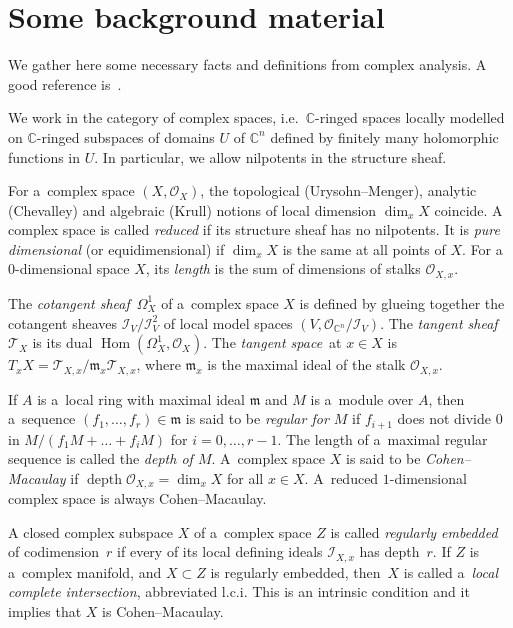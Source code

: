 \section{Some background material
\label{back}
}

We gather here some necessary facts and def\/initions from complex analysis.
A good reference is~\cite{GR}.

We work in the category of complex spaces, i.e.\
${\mathbb C}$-ringed spaces locally modelled on ${\mathbb C}$-ringed subspaces of domains $U$ of ${\mathbb C}^n$ def\/ined
by f\/initely many holomorphic functions in $U$.
In particular, we allow nilpotents in the structure sheaf.

For a~complex space $(X,{\mathcal{O}}_X)$, the topological (Urysohn--Menger), analytic (Chevalley) and algebraic (Krull)
notions of local dimension $\dim_xX$ coincide.
A complex space is called {\em reduced} if its structure sheaf has no nilpotents.
It is {\em pure dimensional} (or equidimensional) if $\dim_x X$ is the same at all points of $X$.
For a~$0$-dimensional space $X$, its {\em length} is the sum of dimensions of stalks ${\mathcal{O}}_{X,x}$.

The {\em cotangent sheaf}\, $\Omega^1_X$ of a~complex space $X$ is def\/ined by glueing together the cotangent sheaves
${\mathcal{I}}_V/{\mathcal{I}}_V^2$ of local model spaces $(V, {\mathcal{O}}_{{\mathbb C}^n}/{\mathcal{I}}_V)$.
The {\em tangent sheaf}\, ${\mathcal{T}}_X$ is its dual $\operatorname{Hom}(\Omega^1_X,{\mathcal{O}}_X)$.
The {\em tangent space}\, at $x\in X$ is $T_xX={\mathcal{T}}_{X,x}/\mathfrak{m}_x {\mathcal{T}}_{X,x}$, where
$\mathfrak{m}_x$ is the maximal ideal of the stalk ${\mathcal{O}}_{X,x}$.

If $A$ is a~local ring with maximal ideal $\mathfrak{m}$ and $M$ is a~module over $A$, then a~sequence
$(f_1,\dots,f_r)\in \mathfrak{m}$ is said to be {\em regular for $M$} if $f_{i+1}$ does not divide $0$ in
$M/(f_1M+\dots+f_iM)$ for $i=0,\dots, r-1$.
The length of a~maximal regular sequence is called the {\em depth of $M$}.
A~complex space $X$ is said to be {\em Cohen--Macaulay} if $\operatorname{depth}{\mathcal{O}}_{X,x}=\dim_xX$ for all
$x\in X$.
A~reduced $1$-dimensional complex space is always Cohen--Macaulay.

A closed complex subspace $X$ of a~complex space $Z$ is called {\em regularly embedded} of codimension~$r$ if every of
its local def\/ining ideals $ {\mathcal{I}}_{X,x}$ has depth~$r$.
If $Z$ is a~complex manifold, and $X\subset Z$ is regularly embedded, then~$X$ is called a~{\em local complete
intersection}, abbreviated l.c.i.
This is an intrinsic condition and it implies that $X$ is Cohen--Macaulay.

